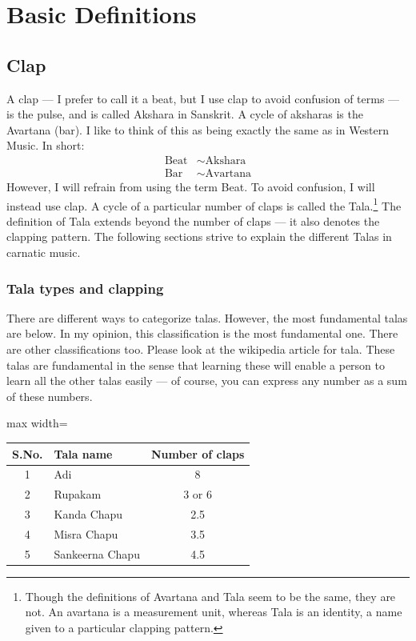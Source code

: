 \chapter{Basic Definitions}

\section{Clap}

A clap --- I prefer to call it a beat, but I use clap to avoid confusion of terms ---
is the pulse, and is called Akshara in Sanskrit. A cycle of aksharas is the Avartana
(bar). I like to think of this as being exactly the same as in Western Music. In
short:
\begin{align*}
  \text{Beat} &\sim \text{Akshara}\\
  \text{Bar}  &\sim \text{Avartana}
\end{align*}
However, I will refrain from using the term Beat. To avoid confusion, I will instead
use clap. A cycle of a particular number of claps is called the Tala.\footnote{Though
the definitions of Avartana and Tala seem to be the same, they are not. An avartana
is a measurement unit, whereas Tala is an identity, a name given to a particular
clapping pattern.} The definition of Tala extends beyond the number of claps --- it
also denotes the clapping pattern. The following sections strive to explain the
different Talas in carnatic music.

\subsection{Tala types and clapping}

There are different ways to categorize talas. However, the most fundamental talas are
below. In my opinion, this classification is the most fundamental one. There are
other classifications too. Please look at the wikipedia article for tala. These talas
are fundamental in the sense that learning these will enable a person to learn all
the other talas easily --- of course, you can express any number as a sum of these
numbers.

\begin{center}
\begin{adjustbox}{max width=\textwidth}
\begin{tabular}{c l c}
\toprule
S.No. & Tala name & Number of claps\\
\midrule
1 & Adi             & 8\\
2 & Rupakam         & 3 or 6\\
3 & Kanda Chapu     & 2.5\\
4 & Misra Chapu     & 3.5\\
5 & Sankeerna Chapu & 4.5\\
\bottomrule
\end{tabular}
\end{adjustbox}
\end{center}

